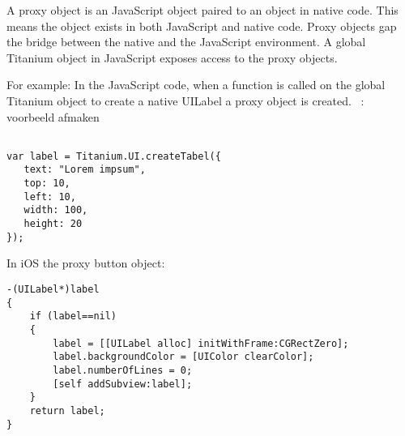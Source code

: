 A proxy object is an JavaScript object paired to an object in native code.\cite{Whinnery2012} This means the object exists in both JavaScript and native code. Proxy objects gap the bridge between the native and the JavaScript environment. A global Titanium object in JavaScript exposes access to the proxy objects. 




For example: In the JavaScript code, when a function is called on the global Titanium object to create a native UILabel a proxy object is created.
\   : voorbeeld afmaken
\begin{verbatim}

var label = Titanium.UI.createTabel({
   text: "Lorem impsum",
   top: 10,
   left: 10,
   width: 100,
   height: 20
});
\end{verbatim}


In iOS the proxy button object:

\begin{verbatim}
-(UILabel*)label
{
    if (label==nil)
    {
        label = [[UILabel alloc] initWithFrame:CGRectZero];
        label.backgroundColor = [UIColor clearColor];
        label.numberOfLines = 0;
        [self addSubview:label];
    }
    return label;
}
\end{verbatim}

